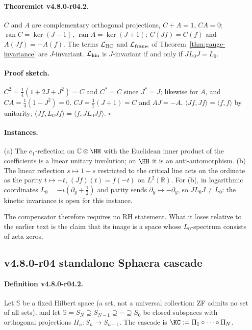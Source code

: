 \paragraph{Theoremlet v4.8.0-r04.2.}
\(C\) and \(A\) are complementary orthogonal projections, \(C+A=1\), \(CA=0\);
\(\operatorname{ran}C=\ker(J-1)\), \(\operatorname{ran}A=\ker(J+1)\); \(C(Jf)=C(f)\) and
\(A(Jf)=-A(f)\).  The terms \(\mathcal L_{\rm HC}\) and \(\mathcal L_{\rm frame}\) of
Theorem~\ref{thm:gauge-invariance} are \(J\)-invariant.  \(\mathcal L_{\rm kin}\) is
\(J\)-invariant if and only if \(JL_0J=L_0\).

\paragraph{Proof sketch.}
\(C^2=\tfrac14(1+2J+J^2)=C\) and \(C^*=C\) since \(J^*=J\); likewise for \(A\), and
\(CA=\tfrac14(1-J^2)=0\).  \(CJ=\tfrac12(J+1)=C\) and \(AJ=-A\).  \(\langle Jf,Jf\rangle=\langle
f,f\rangle\) by unitarity; \(\langle Jf,L_0Jf\rangle=\langle f,JL_0Jf\rangle\).  \(\square\)

\paragraph{Instances.}
(a) The \(e_1\)-reflection on \(\mathbb C\otimes\HH\) with the Euclidean inner product of the
coefficients is a linear unitary involution; on \(\HH\) it is an anti-automorphism.
(b) The linear reflection \(s\mapsto1-s\) restricted to the critical line acts on the ordinate as
the parity \(t\mapsto-t\), \((Jf)(t)=f(-t)\) on \(L^2(\mathbb R)\).  For (b), in logarithmic
coordinates \(L_0=-i(\partial_y+\tfrac12)\) and parity sends \(\partial_y\mapsto-\partial_y\), so
\(JL_0J\neq L_0\): the kinetic invariance is open for this instance.

The compensator therefore requires no RH statement.  What it loses relative to the earlier
text is the claim that its image is a space whose \(L_0\)-spectrum consists of zeta zeros.

\subsection*{v4.8.0-r04 standalone Sphaera cascade}
\label{subsec:v480-r04-standalone-cascade}

\paragraph{Definition v4.8.0-r04.2.}
Let \(\mathbb S\) be a fixed Hilbert space (a set, not a universal collection: ZF admits no
set of all sets), and let \(\mathbb S=S_N\supseteq S_{N-1}\supseteq\cdots\supseteq S_0\) be
closed subspaces with orthogonal projections \(\Pi_n:S_n\to S_{n-1}\).  The cascade is
\(\KC:=\Pi_1\circ\cdots\circ\Pi_N\).

